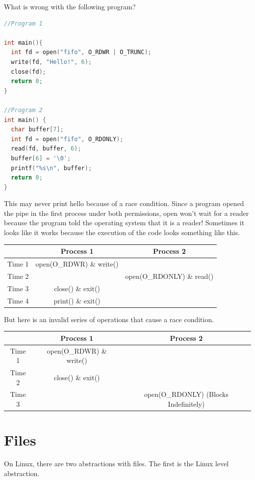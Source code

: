 What is wrong with the following program?

\begin{lstlisting}[language=C]
//Program 1

int main(){
  int fd = open("fifo", O_RDWR | O_TRUNC);
  write(fd, "Hello!", 6);
  close(fd);
  return 0;
}

//Program 2
int main() {
  char buffer[7];
  int fd = open("fifo", O_RDONLY);
  read(fd, buffer, 6);
  buffer[6] = '\0';
  printf("%s\n", buffer);
  return 0;
}
\end{lstlisting}

This may never print hello because of a race condition.
Since a program opened the pipe in the first process under both permissions, open won't wait for a reader because the program told the operating system that it is a reader!
Sometimes it looks like it works because the execution of the code looks something like this.

\begin{tabular}{|c|c|c|}
  & Process 1 & Process 2 \\ \hline
  Time 1 & open(O\_RDWR) \& write() & \\
  Time 2 & & open(O\_RDONLY) \& read() \\
  Time 3 & close() \& exit() & \\
  Time 4 & print() \& exit() & \\
\end{tabular}

But here is an invalid series of operations that cause a race condition.

\begin{tabular}{|c|c|c|}
  & Process 1 & Process 2 \\ \hline
  Time 1 & open(O\_RDWR) \& write() & \\
  Time 2 & close() \& exit() & \\
  Time 3 & & open(O\_RDONLY) (Blocks Indefinitely) \\
\end{tabular}

\section{Files}

On Linux, there are two abstractions with files. The first is the Linux  level abstraction.

